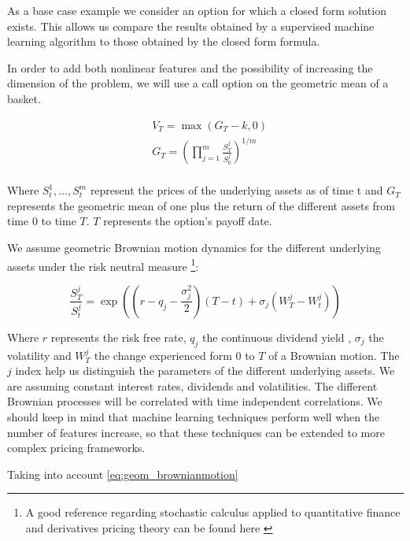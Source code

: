 As a base case example we consider an option for which a closed form solution exists. This allows us compare the results obtained by a supervised machine learning algorithm to those obtained by the closed form formula.

In order to add both nonlinear features and the possibility of increasing the dimension of the problem, we will use a call option on the geometric mean of a basket.

\begin{equation}\label{eq:geom_digital}
\begin{aligned}
&V_{T}=\max\left(G_T-k,0\right) \\
&G_{T}=\left(\prod_{j=1}^{m} \frac{S_{T}^{j}}{S_{0}^{j}}\right)^{1 / m} \\
\end{aligned}
\end{equation}

Where $S_t^1,\ldots,S_t^m$ represent the prices of the underlying assets as of time t and $G_T$ represents the geometric mean of one plus the return of the different assets from time $0$ to time $T$. $T$ represents the option's payoff date.

We assume geometric Brownian motion dynamics for the different underlying assets under the risk neutral measure \footnote{A good reference regarding stochastic calculus applied to quantitative finance and derivatives pricing theory can be found here \cite{Borj}}:

\begin{equation}\label{eq:geom_brownianmotion}
\frac{S_{T}^{j}}{S_{t}^{j}}=\exp\left(\left(r-q_{j}-\frac{\sigma_{j}^{2}}{2}\right) \left( T - t\right)+\sigma_{j} \left(W_{T}^{j}-W_{t}^{j}\right)\right)
\end{equation}

Where $r$ represents the risk free rate, $q_j$ the continuous dividend yield , $\sigma_j$ the volatility and $W_T^j$ the change experienced form $0$ to $T$ of a Brownian motion. The $j$ index help us distinguish the parameters of the different underlying assets.
 We are assuming constant interest rates, dividends and volatilities. The different Brownian processes will be correlated with time independent correlations. We should 
 keep in mind that machine learning techniques perform well when the number of features increase, so that these techniques can be extended to more complex pricing frameworks. 




Taking into account \ref{eq:geom_brownianmotion}

